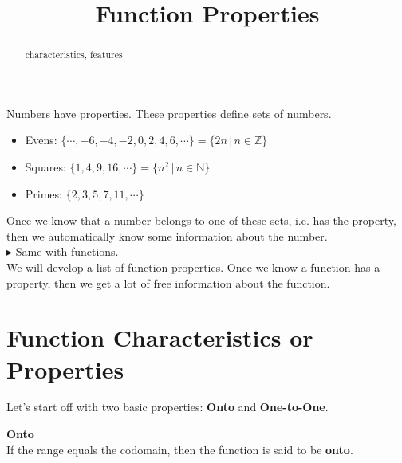 \documentclass{ximera}
\title{Function Properties}
\begin{document}
\begin{abstract}
characteristics, features
\end{abstract}
\maketitle





Numbers have properties.  These properties define sets of numbers.

\begin{itemize}
\item Evens:  $\{ \cdots, -6, -4, -2, 0, 2, 4, 6, \cdots \} = \{ 2n   \, | \, n \in \mathbb{Z} \}$
\item Squares:  $\{ 1, 4, 9, 16, \cdots \} = \{ n^2   \, | \, n \in \mathbb{N} \}$
\item Primes:  $\{ 2, 3, 5, 7, 11,  \cdots \}$
\end{itemize}

Once we know that a number belongs to one of these sets, i.e. has the property, then we automatically know some information about the number. \\


$\blacktriangleright$ Same with functions. \\



We will develop a list of function properties.  Once we know a function has a property, then we get a lot of free information about the function. \\









\section{Function Characteristics or Properties}


Let's start off with two basic properties: \textbf{Onto} and \textbf{One-to-One}.







\begin{definition} \textbf{\textcolor{green!50!black}{Onto}} \\

If the range equals the codomain, then the function is said to be \textbf{onto}.

\end{definition}
\end{document}
